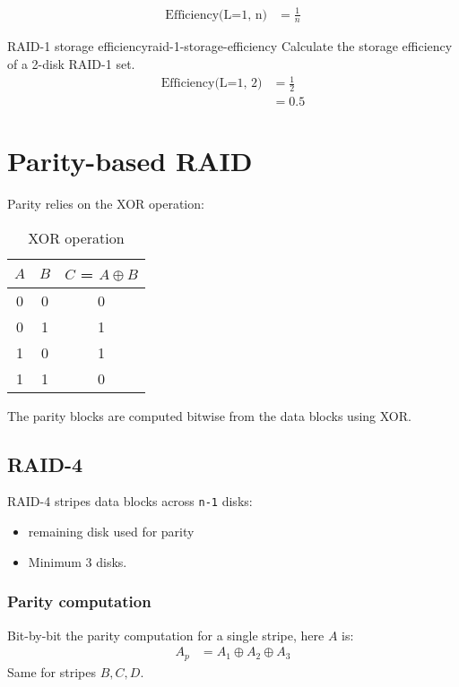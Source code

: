 \documentclass[slides]{pgnotes}
\begin{document}
\begin{align}
  \mbox{Efficiency(L=1, n)} & = \frac{1}{n} \label{eq:raid-1-storage-efficiency} 
\end{align}

\begin{example}{RAID-1 storage efficiency}{raid-1-storage-efficiency}
  Calculate the storage efficiency of a 2-disk RAID-1 set.
  \tcblower
  \begin{align}
    \mbox{Efficiency(L=1, 2)} & = \frac{1}{2} \\
                              & = 0.5
  \end{align}
\end{example}


\section{Parity-based RAID}
\label{sec:parity-based-raid}

Parity relies on the XOR operation:

\begin{table}[htbp]
  \centering
  \begin{tabular}{c c c}
    \toprule
    $A$ & $B$ & $C$ = $A \oplus B$ \\
    \midrule
    0 & 0 & 0 \\
    0 & 1 & 1 \\
    1 & 0 & 1 \\
    1 & 1 & 0 \\
    \bottomrule
  \end{tabular}
  \caption{XOR operation}
  \label{tab:xor-operation}
\end{table}

The parity blocks are computed bitwise from the data blocks using XOR.

\subsection{RAID-4}
\label{sec:raid-4}

\begin{minipage}{0.4\linewidth}
  RAID-4 stripes data blocks across \texttt{n-1} disks:
  \begin{itemize}
  \item remaining disk used for parity
  \item Minimum 3 disks.
  \end{itemize}
\subsubsection{Parity computation}
Bit-by-bit the parity computation for a single stripe, here $A$ is:
\begin{align}
  A_p & = A_1 \oplus A_2 \oplus A_3 \label{eq:single-stripe-parity}
\end{align}
Same for stripes $B, C, D$.

\end{minipage}
\begin{minipage}{0.59\linewidth}
\end{minipage}
\end{document}
